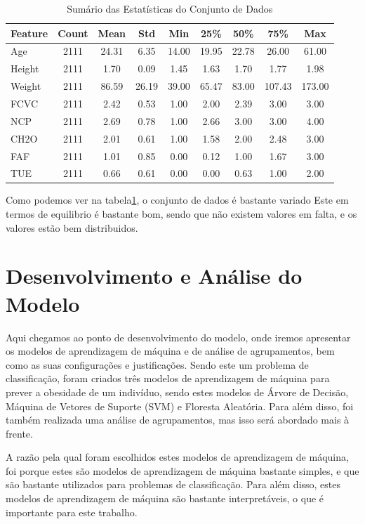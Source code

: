 \documentclass{easychair}
\begin{document}
\begin{table}[hbt!]
  \centering
  \begin{tabular}{l c c c c c c c c}
  \toprule
  Feature & Count & Mean & Std & Min & 25\% & 50\% & 75\% & Max \\
  \midrule
  Age & 2111 & 24.31 & 6.35 & 14.00 & 19.95 & 22.78 & 26.00 & 61.00 \\
  Height & 2111 & 1.70 & 0.09 & 1.45 & 1.63 & 1.70 & 1.77 & 1.98 \\
  Weight & 2111 & 86.59 & 26.19 & 39.00 & 65.47 & 83.00 & 107.43 & 173.00 \\
  FCVC & 2111 & 2.42 & 0.53 & 1.00 & 2.00 & 2.39 & 3.00 & 3.00 \\
  NCP & 2111 & 2.69 & 0.78 & 1.00 & 2.66 & 3.00 & 3.00 & 4.00 \\
  CH2O & 2111 & 2.01 & 0.61 & 1.00 & 1.58 & 2.00 & 2.48 & 3.00 \\
  FAF & 2111 & 1.01 & 0.85 & 0.00 & 0.12 & 1.00 & 1.67 & 3.00 \\
  TUE & 2111 & 0.66 & 0.61 & 0.00 & 0.00 & 0.63 & 1.00 & 2.00 \\
  \bottomrule
  \end{tabular}
  \caption{Sumário das Estatísticas do Conjunto de Dados}
  \label{tab:summary}
\end{table}

Como podemos ver na tabela\ref{tab:summary}, o conjunto de dados é bastante variado Este em termos de equilibrio é bastante bom, sendo que não existem valores em falta, e os valores estão bem distribuidos.

\section{Desenvolvimento e Análise do Modelo}

Aqui chegamos ao ponto de desenvolvimento do modelo, onde iremos apresentar os modelos de aprendizagem de máquina e de análise de agrupamentos, bem como as suas configurações e justificações. Sendo este um problema de classificação, foram criados três modelos de aprendizagem de máquina para prever a obesidade de um indivíduo, sendo estes modelos de Árvore de Decisão, Máquina de Vetores de Suporte (SVM) e Floresta Aleatória. Para além disso, foi também realizada uma análise de agrupamentos, mas isso será abordado mais à frente.

A razão pela qual foram escolhidos estes modelos de aprendizagem de máquina, foi porque estes são modelos de aprendizagem de máquina bastante simples, e que são bastante utilizados para problemas de classificação. Para além disso, estes modelos de aprendizagem de máquina são bastante interpretáveis, o que é importante para este trabalho.
\end{document}
